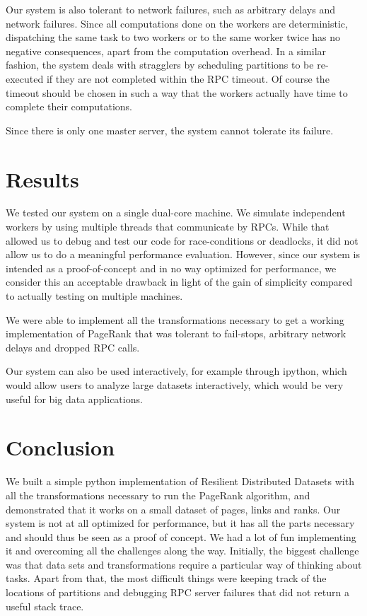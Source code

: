 \documentclass[10pt]{article}
\begin{document}
Our system is also tolerant to network failures, such as arbitrary delays and network failures. Since all computations done on the workers are deterministic, dispatching the same task to two workers or to the same worker twice has no negative consequences, apart from the computation overhead. In a similar fashion, the system deals with stragglers by scheduling partitions to be re-executed if they are not completed within the RPC timeout. Of course the timeout should be chosen in such a way that the workers actually have time to complete their computations.


Since there is only one master server, the system cannot tolerate its failure.

\section*{Results} We tested our system on a single dual-core machine. We simulate independent workers by using multiple threads that communicate by RPCs. While that allowed us to debug and test our code for race-conditions or deadlocks, it did
not allow us to do a meaningful performance evaluation. However, since our
system is intended as a proof-of-concept and in no way optimized for
performance, we consider this an acceptable drawback in light of the gain of simplicity compared to actually testing on multiple machines.


We were able to implement all the transformations necessary to get a working implementation of PageRank that was tolerant to fail-stops, arbitrary network delays and dropped RPC calls.

Our system can also be used interactively, for example through ipython, which would allow users to analyze large datasets interactively, which would be very useful for big data applications. 

\section*{Conclusion}
We built a simple python implementation of Resilient Distributed Datasets with all the transformations necessary to run the PageRank algorithm, and demonstrated that it works on a small dataset of pages, links and ranks. Our system is not at all optimized for performance, but it has all the parts necessary and should thus be seen as a proof of concept. We had a lot of fun implementing it and overcoming all the challenges along the way. Initially, the biggest challenge was that data sets and transformations require a particular way of thinking about tasks. Apart from that, the most difficult things were keeping track of the locations of partitions and debugging RPC server failures that did not return a useful stack trace.





 
\end{document}
